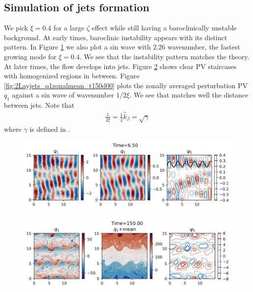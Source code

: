 \subsection{Simulation of jets formation}
We pick $\xi = 0.4$ for a large $\zeta$ effect while still having a baroclinically unstable background. At early times, baroclinic instability appears with its distinct pattern. In Figure \ref{fig:2Layjets_q1_t6d50} we also plot a sin wave with $2.26$ wavenumber, the fastest growing mode for $\xi = 0.4$. We see that the instability pattern matches the theory. At later times, the flow develops into jets. Figure \ref{fig:2Layjets_q1_t150d00} shows clear PV staircases with homogenized regions in between. Figure \ref{fig:2Layjets_q1zonalmean_t150d00} plots the zonally averaged perturbation PV $q_1$ against a sin wave of wavenumber $1/2\xi$. We see that matches well the distance between jets. Note that
\begin{align}
    \frac{1}{2\xi} = \frac{1}{2}\hat{k}_\beta = \sqrt{\gamma}
\end{align}
where $\gamma$ is defined in \cite[(9.115)]{Vallis_17}. 

\begin{figure}
    \centering
    \includegraphics[width=\textwidth]{plot_snap/figs/2Layjets_q1_t6d50}
    \caption{}
    \label{fig:2Layjets_q1_t6d50}
\end{figure}


\begin{figure}
    \centering
    \includegraphics[width=\textwidth]{plot_snap/figs/2Layjets_q1_t150d00}
    \caption{}
    \label{fig:2Layjets_q1_t150d00}
\end{figure}

